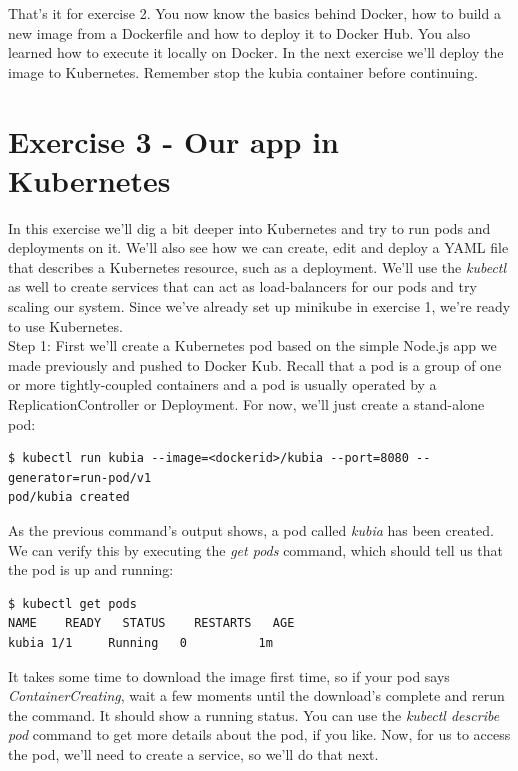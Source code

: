\documentclass[a4paper,10pt]{article}
\begin{document}
That's it for exercise 2. You now know the basics behind Docker, how to build a new image from a Dockerfile and how to deploy it to Docker Hub. You also learned how to execute it locally on Docker. In the next exercise we'll deploy the image to Kubernetes. Remember stop the kubia container before continuing.

\pagebreak

\section{Exercise 3 - Our app in Kubernetes}

In this exercise we'll dig a bit deeper into Kubernetes and try to run pods and deployments on it. We'll also see how we can create, edit and deploy a YAML file that describes a Kubernetes resource, such as a deployment. We'll use the \textit{kubectl} as well to create services that can act as load-balancers for our pods and try scaling our system. Since we've already set up minikube in exercise 1, we're ready to use Kubernetes. \\

Step 1: First we'll create a Kubernetes pod based on the simple Node.js app we made previously and pushed to Docker Kub. Recall that a pod is a group of one or more tightly-coupled containers and a pod is usually operated by a ReplicationController or Deployment. For now, we'll just create a stand-alone pod:

\begin{lstlisting}[numbers=none, basicstyle=\mdseries]
$ kubectl run kubia --image=<dockerid>/kubia --port=8080 --generator=run-pod/v1
pod/kubia created
\end{lstlisting}

As the previous command's output shows, a pod called \textit{kubia} has been created. We can verify this by executing the \textit{get pods} command, which should tell us that the pod is up and running:

\begin{lstlisting}[numbers=none, basicstyle=\mdseries]
$ kubectl get pods
NAME	READY   STATUS    RESTARTS   AGE
kubia 1/1     Running   0          1m
\end{lstlisting}

It takes some time to download the image first time, so if your pod says \textit{ContainerCreating}, wait a few moments until the download's complete and rerun the command. It should show a running status. You can use the \textit{kubectl describe pod} command to get more details about the pod, if you like. Now, for us to access the pod, we'll need to create a service, so we'll do that next. \\
\end{document}
